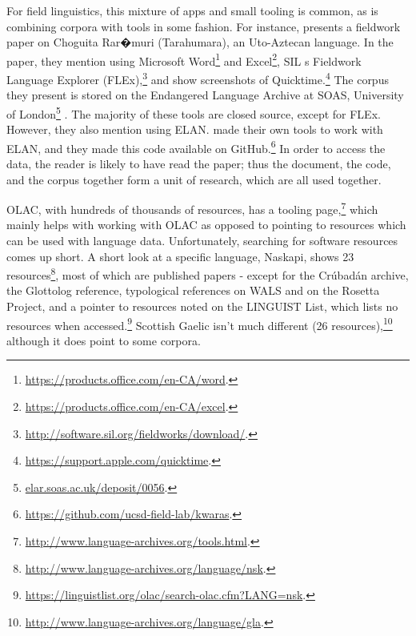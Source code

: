 For field linguistics, this mixture of apps and small tooling is common, as is combining corpora with tools in some fashion. For instance, \citet{caballero2017choguita} presents a fieldwork paper on Choguita Rar�muri (Tarahumara), an Uto-Aztecan language. In the paper, they mention using Microsoft Word\footnote{\href{https://products.office.com/en-CA/word}{https://products.office.com/en-CA/word}. } and Excel\footnote{\href{https://products.office.com/en-CA/excel}{https://products.office.com/en-CA/excel}. }, SIL
s Fieldwork Language Explorer (FLEx),\footnote{\href{http://software.sil.org/fieldworks/download/.}{http://software.sil.org/fieldworks/download/}. } and show screenshots of Quicktime.\footnote{\href{https://support.apple.com/quicktime}{https://support.apple.com/quicktime}. } The corpus they present is stored on the Endangered Language Archive at SOAS, University of London\footnote{\href{elar.soas.ac.uk/deposit/0056}{elar.soas.ac.uk/deposit/0056}. } \citep{caballero2009data}. The majority of these tools are closed source, except for FLEx. However, they also mention using ELAN. \citet{caballero2017choguita} made their own tools to work with ELAN, and they made this code available on GitHub.\footnote{\href{https://github.com/ucsd-field-lab/kwaras}{https://github.com/ucsd-field-lab/kwaras}. } In order to access the data, the reader is likely to have read the paper; thus the document, the code, and the corpus together form a unit of research, which are all used together.

OLAC, with hundreds of thousands of resources, has a tooling page,\footnote{\href{http://www.language-archives.org/tools.html}{http://www.language-archives.org/tools.html}. } which mainly helps with working with OLAC as opposed to pointing to resources which can be used with language data. Unfortunately, searching for software resources comes up short. A short look at a specific language, Naskapi, shows 23 resources\footnote{\href{http://www.language-archives.org/language/nsk}{http://www.language-archives.org/language/nsk}. }, most of which are published papers - except for the Cr\'ubad\'an archive, the Glottolog reference, typological references on WALS and on the Rosetta Project, and a pointer to resources noted on the LINGUIST List, which lists no resources when accessed.\footnote{\href{https://linguistlist.org/olac/search-olac.cfm?LANG=nsk}{https://linguistlist.org/olac/search-olac.cfm?LANG=nsk}. } Scottish Gaelic isn't much different (26 resources),\footnote{\href{http://www.language-archives.org/language/gla}{http://www.language-archives.org/language/gla}. } although it does point to some corpora.

